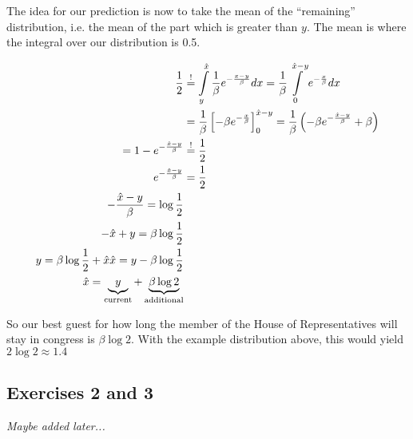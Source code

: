 \documentclass[../main/Notes.tex]{subfiles}
\begin{document}
The idea for our prediction is now to take the mean of the ``remaining'' distribution, i.e. the mean of the part which is greater than $y$. The mean is where the integral over our distribution is 0.5.

\begin{align*}
\frac{1}{2} &\stackrel{!}{=} \int\limits_y^{\est{x}} \frac{1}{\beta} e^{-\frac{x-y}{\beta} } dx = \frac{1}{\beta} \int\limits_0^{\est{x}-y} e^{-\frac{x}{\beta}} dx \\
&= \frac{1}{\beta} \left[-\beta e^{-\frac{x}{\beta}}\right]_0^{\est{x}-y} = \frac{1}{\beta} \left( -\beta e^{-\frac{\est{x}-y}{\beta}} + \beta \right) \\
= 1 - e^{-\frac{\est{x}-y}{\beta}} &\stackrel{!}{=} \frac{1}{2} \\
e^{-\frac{\est{x}-y}{\beta}} &= \frac{1}{2} \\
-\frac{\est{x}-y}{\beta} = \log {\frac{1}{2}} \\
-\est{x}+y = \beta \log{ \frac{1}{2} } \\
y = \beta \log{ \frac{1}{2} } + \est{x}
\est{x} = y-\beta \log{ \frac{1}{2} } \\
\est{x} = \underbrace{y}_{\text{current}}+\underbrace{\beta \log{ 2 }}_{\text{additional}}
\end{align*}

So our best guest for how long the member of the House of Representatives will stay in congress is $\beta \log{2}$. With the example distribution above, this would yield $2\log{2} \approx 1.4$



\subsection*{Exercises 2 and 3}
\emph{Maybe added later...}
\end{document}
